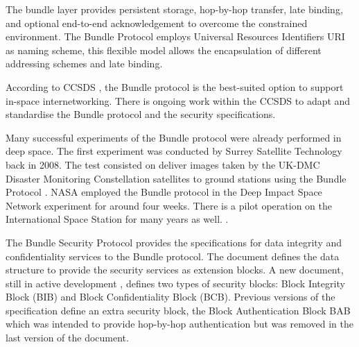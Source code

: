 The bundle layer provides persistent storage, hop-by-hop transfer, late binding, and optional end-to-end acknowledgement to overcome the constrained environment. The Bundle Protocol employs Universal Resources Identifiers URI as naming scheme, this flexible model allows the encapsulation of different addressing schemes and late binding. 

According to CCSDS \cite{rationale2010requirements}, the Bundle protocol is the best-suited option to support in-space internetworking. There is ongoing work within the CCSDS to adapt and standardise the Bundle protocol and the security specifications. %

Many successful experiments of the Bundle protocol were already performed in deep space. The first experiment was conducted by Surrey Satellite Technology back in 2008. The test consisted on deliver images taken by the UK-DMC Disaster Monitoring Constellation satellites to ground stations using the Bundle Protocol \cite{ivancic2010experience}. NASA employed the Bundle protocol in the Deep Impact Space Network experiment for around four weeks. There is a pilot operation on the International Space Station for many years as well. \cite{araniti2015contact}.    




 
 
 The Bundle Security Protocol \cite{rfc6257} provides the specifications for data integrity and confidentiality services to the Bundle protocol. The document defines the data structure to provide the security services as extension blocks. A new document, still in active development \cite{ietf-dtn-bpsec-07}, defines two types of security blocks: Block Integrity Block (BIB) and Block Confidentiality Block (BCB). Previous versions of the specification define an extra security block, the Block Authentication Block BAB which was intended to provide hop-by-hop authentication but was removed in the last version of the document.     
 
